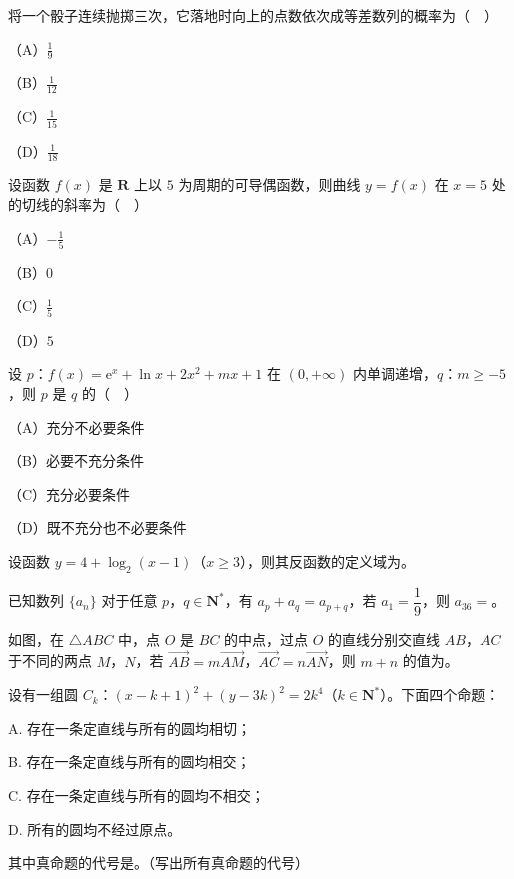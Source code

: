 \begin{question}
将一个骰子连续抛掷三次，它落地时向上的点数依次成等差数列的概率为（　）

（A）$\frac19$

（B）$\frac1{12}$

（C）$\frac1{15}$

（D）$\frac1{18}$

\end{question}
\begin{question}
设函数 $f(x)$ 是 $\mathbf R$ 上以 $5$ 为周期的可导偶函数，则曲线 $y=f(x)$ 在 $x=5$ 处的切线的斜率为（　）

（A）$-\frac15$

（B）$0$

（C）$\frac15$

（D）$5$

\end{question}
\begin{question}
设 $p$：$f(x)=\mathrm e^x+\ln x+2x^2+mx+1$ 在 $(0,+\infty)$ 内单调递增，$q$：$m\geqslant-5$，则 $p$ 是 $q$ 的（　）

（A）充分不必要条件

（B）必要不充分条件

（C）充分必要条件

（D）既不充分也不必要条件

\end{question}

\begin{question}
设函数 $y=4+\log_2(x-1)$（$x\geqslant3$），则其反函数的定义域为\gkblank{}。

\end{question}
\begin{question}
已知数列 $\{a_n\}$ 对于任意 $p$，$q\in\mathbf N^*$，有 $a_p+a_q=a_{p+q}$，若 $a_1=\dfrac19$，则 $a_{36}=$\gkblank{}。

\Needspace{0.4\textheight}
\end{question}
\begin{question}
如图，在 $\triangle ABC$ 中，点 $O$ 是 $BC$ 的中点，过点 $O$ 的直线分别交直线 $AB$，$AC$ 于不同的两点 $M$，$N$，若 $\overrightarrow{AB}=m\overrightarrow{AM}$，$\overrightarrow{AC}=n\overrightarrow{AN}$，则 $m+n$ 的值为\gkblank{}。
\nopagebreak[4]
\begin{center}\end{center}
\nopagebreak[4]
\end{question}
\begin{question}
设有一组圆 $C_k$：$(x-k+1)^2+(y-3k)^2=2k^4$（$k\in\mathbf N^*$）。下面四个命题：

A. 存在一条定直线与所有的圆均相切；

B. 存在一条定直线与所有的圆均相交；

C. 存在一条定直线与所有的圆均不相交；

D. 所有的圆均不经过原点。

其中真命题的代号是\gkblank{}。（写出所有真命题的代号）

\end{question}

